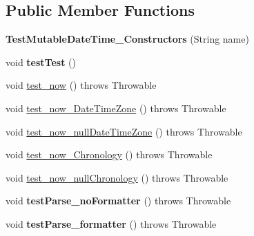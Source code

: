 \subsection*{Public Member Functions}
\begin{DoxyCompactItemize}
\item 
\hypertarget{classorg_1_1joda_1_1time_1_1_test_mutable_date_time___constructors_aade9f6b1da75d9a697ada7f51815ca30}{{\bfseries Test\-Mutable\-Date\-Time\-\_\-\-Constructors} (String name)}\label{classorg_1_1joda_1_1time_1_1_test_mutable_date_time___constructors_aade9f6b1da75d9a697ada7f51815ca30}

\item 
\hypertarget{classorg_1_1joda_1_1time_1_1_test_mutable_date_time___constructors_a064833b993b40cf4e694b9a7b6a9c905}{void {\bfseries test\-Test} ()}\label{classorg_1_1joda_1_1time_1_1_test_mutable_date_time___constructors_a064833b993b40cf4e694b9a7b6a9c905}

\item 
void \hyperlink{classorg_1_1joda_1_1time_1_1_test_mutable_date_time___constructors_a0c7b6d7cef7a908bcf89025414c74d58}{test\-\_\-now} ()  throws Throwable 
\item 
void \hyperlink{classorg_1_1joda_1_1time_1_1_test_mutable_date_time___constructors_abe2abc839aa51ecb9adc2a3574037364}{test\-\_\-now\-\_\-\-Date\-Time\-Zone} ()  throws Throwable 
\item 
void \hyperlink{classorg_1_1joda_1_1time_1_1_test_mutable_date_time___constructors_a03cf5fa8a95c7db4201ef8f48495fc34}{test\-\_\-now\-\_\-null\-Date\-Time\-Zone} ()  throws Throwable 
\item 
void \hyperlink{classorg_1_1joda_1_1time_1_1_test_mutable_date_time___constructors_af60e3baefaabf90b4db481a49bae74d4}{test\-\_\-now\-\_\-\-Chronology} ()  throws Throwable 
\item 
void \hyperlink{classorg_1_1joda_1_1time_1_1_test_mutable_date_time___constructors_a7db36f2512327fbf3732429ebe47aaa8}{test\-\_\-now\-\_\-null\-Chronology} ()  throws Throwable 
\item 
\hypertarget{classorg_1_1joda_1_1time_1_1_test_mutable_date_time___constructors_aeb4a5a1e608797b853c334238a123658}{void {\bfseries test\-Parse\-\_\-no\-Formatter} ()  throws Throwable }\label{classorg_1_1joda_1_1time_1_1_test_mutable_date_time___constructors_aeb4a5a1e608797b853c334238a123658}

\item 
\hypertarget{classorg_1_1joda_1_1time_1_1_test_mutable_date_time___constructors_a0d61706e5107089f9bcd4e045609b7f7}{void {\bfseries test\-Parse\-\_\-formatter} ()  throws Throwable }\label{classorg_1_1joda_1_1time_1_1_test_mutable_date_time___constructors_a0d61706e5107089f9bcd4e045609b7f7}


\end{DoxyCompactItemize}
